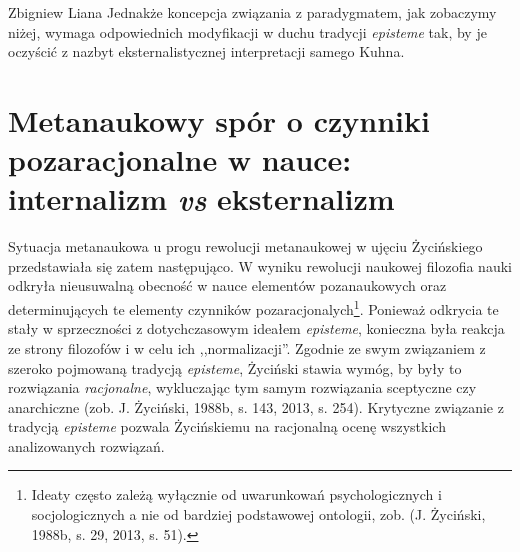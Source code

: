 \begin{artplenv}{Zbigniew Liana}
Jednakże koncepcja związania z paradygmatem, jak zobaczymy niżej, wymaga odpowiednich modyfikacji w duchu tradycji
\textit{episteme} tak, by je oczyścić z nazbyt eksternalistycznej interpretacji samego Kuhna.

\section{Metanaukowy spór o czynniki pozaracjonalne w nauce: internalizm \textit{vs} eksternalizm}

Sytuacja metanaukowa u progu rewolucji metanaukowej w ujęciu Życińskiego przedstawiała się zatem następująco. W wyniku
rewolucji naukowej filozofia nauki odkryła nieusuwalną obecność w nauce elementów pozanaukowych oraz determinujących te
elementy czynników pozaracjonalych\footnote{Ideaty często zależą wyłącznie od uwarunkowań
psychologicznych i socjologicznych a nie od bardziej podstawowej ontologii, zob. \label{ref:RNDZ7VFgO3ocx}(J. Życiński, 1988b, s. 29,
2013, s. 51).}. Ponieważ odkrycia te stały w sprzeczności z dotychczasowym ideałem \textit{episteme}, konieczna była
reakcja ze strony filozofów i w celu ich ,,normalizacji''. Zgodnie ze swym związaniem z szeroko pojmowaną tradycją
\textit{episteme}, Życiński stawia wymóg, by były to rozwiązania \textit{racjonalne}, wykluczając tym samym rozwiązania
sceptyczne czy anarchiczne \label{ref:RNDlHYNmrMqD0}(zob. J. Życiński, 1988b, s. 143, 2013, s. 254). Krytyczne
związanie z tradycją \textit{episteme} pozwala Życińskiemu na racjonalną ocenę wszystkich analizowanych rozwiązań.


\end{artplenv}
